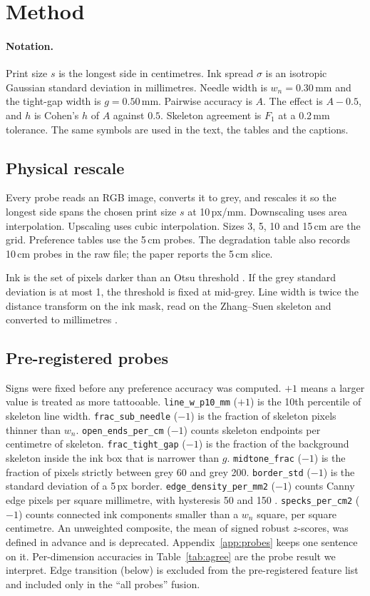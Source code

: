 \section{Method}
\label{sec:method}

\paragraph{Notation.}
Print size $s$ is the longest side in centimetres.
Ink spread $\sigma$ is an isotropic Gaussian standard deviation in millimetres.
Needle width is $w_n{=}0.30$\,mm and the tight-gap width is $g{=}0.50$\,mm.
Pairwise accuracy is $A$.
The effect is $A-0.5$, and $h$ is Cohen's $h$ of $A$ against $0.5$.
Skeleton agreement is $F_1$ at a 0.2\,mm tolerance.
The same symbols are used in the text, the tables and the captions.

\subsection{Physical rescale}
Every probe reads an RGB image, converts it to grey, and rescales it so the longest side spans the chosen print size $s$ at 10\,px/mm.
Downscaling uses area interpolation.
Upscaling uses cubic interpolation.
Sizes 3, 5, 10 and 15\,cm are the grid.
Preference tables use the 5\,cm probes.
The degradation table also records 10\,cm probes in the raw file; the paper reports the 5\,cm slice.

Ink is the set of pixels darker than an Otsu threshold \citep{otsu1979}.
If the grey standard deviation is at most 1, the threshold is fixed at mid-grey.
Line width is twice the distance transform on the ink mask, read on the Zhang--Suen skeleton and converted to millimetres \citep{zhang1984thinning}.

\subsection{Pre-registered probes}
Signs were fixed before any preference accuracy was computed.
$+1$ means a larger value is treated as more tattooable.
\texttt{line\_w\_p10\_mm} ($+1$) is the 10th percentile of skeleton line width.
\texttt{frac\_sub\_needle} ($-1$) is the fraction of skeleton pixels thinner than $w_n$.
\texttt{open\_ends\_per\_cm} ($-1$) counts skeleton endpoints per centimetre of skeleton.
\texttt{frac\_tight\_gap} ($-1$) is the fraction of the background skeleton inside the ink box that is narrower than $g$.
\texttt{midtone\_frac} ($-1$) is the fraction of pixels strictly between grey 60 and grey 200.
\texttt{border\_std} ($-1$) is the standard deviation of a 5\,px border.
\texttt{edge\_density\_per\_mm2} ($-1$) counts Canny edge pixels per square millimetre, with hysteresis 50 and 150 \citep{canny1986}.
\texttt{specks\_per\_cm2} ($-1$) counts connected ink components smaller than a $w_n$ square, per square centimetre.
An unweighted composite, the mean of signed robust $z$-scores, was defined in advance and is deprecated.
Appendix~\ref{app:probes} keeps one sentence on it.
Per-dimension accuracies in Table~\ref{tab:agree} are the probe result we interpret.
Edge transition (below) is excluded from the pre-registered feature list and included only in the ``all probes'' fusion.

